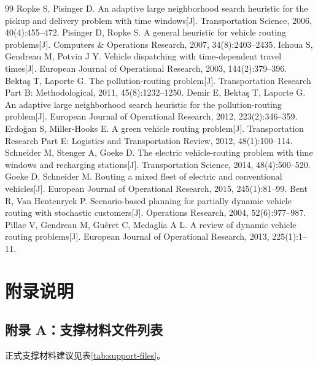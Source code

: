 \documentclass[UTF8,zihao=-4,a4paper]{ctexart}
\begin{document}
\begin{thebibliography}{99}
 Ropke S, Pisinger D. An adaptive large neighborhood search heuristic for the pickup and delivery problem with time windows[J]. Transportation Science, 2006, 40(4):455--472.
 Pisinger D, Ropke S. A general heuristic for vehicle routing problems[J]. Computers \& Operations Research, 2007, 34(8):2403--2435.
 Ichoua S, Gendreau M, Potvin J Y. Vehicle dispatching with time-dependent travel times[J]. European Journal of Operational Research, 2003, 144(2):379--396.
 Bektaş T, Laporte G. The pollution-routing problem[J]. Transportation Research Part B: Methodological, 2011, 45(8):1232--1250.
 Demir E, Bektaş T, Laporte G. An adaptive large neighborhood search heuristic for the pollution-routing problem[J]. European Journal of Operational Research, 2012, 223(2):346--359.
 Erdoğan S, Miller-Hooks E. A green vehicle routing problem[J]. Transportation Research Part E: Logistics and Transportation Review, 2012, 48(1):100--114.
 Schneider M, Stenger A, Goeke D. The electric vehicle-routing problem with time windows and recharging stations[J]. Transportation Science, 2014, 48(4):500--520.
 Goeke D, Schneider M. Routing a mixed fleet of electric and conventional vehicles[J]. European Journal of Operational Research, 2015, 245(1):81--99.
 Bent R, Van Hentenryck P. Scenario-based planning for partially dynamic vehicle routing with stochastic customers[J]. Operations Research, 2004, 52(6):977--987.
 Pillac V, Gendreau M, Guéret C, Medaglia A L. A review of dynamic vehicle routing problems[J]. European Journal of Operational Research, 2013, 225(1):1--11.
\end{thebibliography}

\appendix
\section{附录说明}

\subsection{附录 A：支撑材料文件列表}

正式支撑材料建议见表\ref{tab:support-files}。
\end{document}
